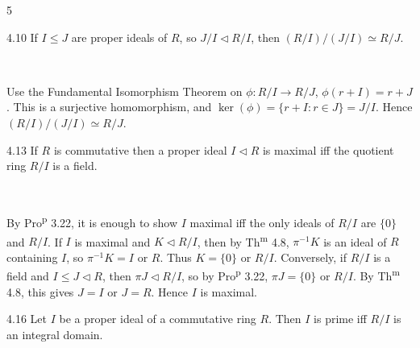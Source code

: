 \documentclass[8pt]{extarticle}
\makeatletter
\renewenvironment{proof}[1][\proofname]{%
  \pushQED{\qed}%
  \par\noindent\normalfont\itshape #1\@addpunct{.}\ \normalfont\ignorespaces
}{%
  \popQED%
  \par
}
\makeatother
\begin{document}
\begin{multicols*}{5}
        \begin{theorem}{4.10}
            If \(I\le J\) are proper ideals of \(R\), so \(J/I\lhd R/I\), then \((R/I)/(J/I)\simeq R/J\).
        \end{theorem}

        \begin{proof}
            Use the Fundamental Isomorphism Theorem on \(\phi:R/I\to R/J\), \(\phi(r+I)=r+J\). This is a surjective homomorphism, and \(\ker(\phi)=\{r+I:r\in J\}=J/I\). Hence \((R/I)/(J/I)\simeq R/J\).
        \end{proof}
        \begin{center}
            \vspace{-8pt}
            \vspace{-14pt}
        \end{center}

        \begin{corollary}{4.13}
            If \(R\) is commutative then a proper ideal \(I\lhd R\) is maximal iff the quotient ring \(R/I\) is a field.
        \end{corollary}

        \begin{proof}
            By Pro\textsuperscript{p} 3.22, it is enough to show \(I\) maximal iff the only ideals of \(R/I\) are \(\{0\}\) and \(R/I\). If \(I\) is maximal and \(K\lhd R/I\), then by Th\textsuperscript{m} 4.8, \(\pi^{-1}K\) is an ideal of \(R\) containing \(I\), so \(\pi^{-1}K=I\) or \(R\). Thus \(K=\{0\}\) or \(R/I\). Conversely, if \(R/I\) is a field and \(I\le J\lhd R\), then \(\pi J\lhd R/I\), so by Pro\textsuperscript{p} 3.22, \(\pi J=\{0\}\) or \(R/I\). By Th\textsuperscript{m} 4.8, this gives \(J=I\) or \(J=R\). Hence \(I\) is maximal.
        \end{proof}

        \begin{theorem}{4.16}
            Let \(I\) be a proper ideal of a commutative ring \(R\). Then \(I\) is prime iff \(R/I\) is an integral domain.
        \end{theorem}


\end{multicols*}
\end{document}
